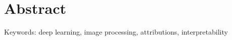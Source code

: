 \chapter*{Abstract}


\vspace{0.5cm}
Keywords: deep learning, image processing, attributions, interpretability

